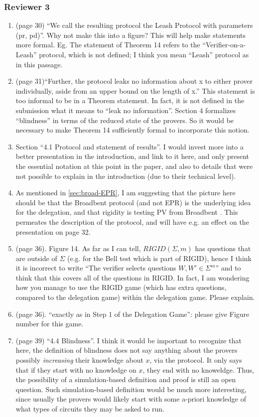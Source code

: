 \documentclass[12pt]{article}
\newcommand{\Broad}{{\sf Broadbent }}
\begin{document}
\subsubsection*{Reviewer 3}
\begin{enumerate}
\item (page 30) ``We call the resulting protocol the Leash Protocol with parameters (pr, pd)''. Why not make this into a figure? This will help make statements more formal. Eg. The statement of Theorem 14 refers to the ``Verifier-on-a-Leash'' protocol, which is not defined; I think you mean ``Leash'' protocol as in this passage.
    \item (page 31)``Further, the protocol leaks no information about x to either prover individually, aside from an upper bound
on the length of x.'' This statement is too informal to be in a Theorem statement. In fact, it is not defined in the submission what it means to ``leak no information''. Section 4 formalizes ``blindness'' in terms of the reduced state of the provers. So it would be necessary to make Theorem 14 sufficiently formal to incorporate this notion.
\item Section ``4.1 Protocol and statement of results''. I would invest more into a better presentation in the introduction, and link to it here, and only present the essential notation at this point in the paper, and also to details that were not possible to explain in the introduction (due to their technical level).
 \item As mentioned in \ref{sec:broad-EPR}, I am suggesting that the picture here should be that the \Broad protocol (and not EPR) is the underlying idea for the delegation, and that rigidity is testing PV from \Broad. This permeates the description of the protocol, and will have e.g. an effect on the presentation on page 32.
     \item (page 36). Figure 14. As far as I can tell, $RIGID(\Sigma, m)$ has questions that are outside of $\Sigma$ (e.g. for the Bell test which is part of RIGID), hence I think it is incorrect to write ``The verifier selects questions $W, W' \in \Sigma^m$'' and to think that this covers all of the questions in RIGID. In fact, I am wondering how you manage to use the RIGID game (which has extra questions, compared to the delegation game) within the delegation game. Please explain.
         \item (page 36). ``exactly as in Step 1 of the Delegation Game'': please give Figure number for this game.
\item (page 39) ``4.4 Blindness''. I think it would be important to recognize that here, the definition of blindness does not say anything about the provers possibly \emph{increasing} their knowledge about $x$, via the protocol. It only says that if they start with no knowledge on $x$, they end with no knoweldge. Thus, the possibility of a simulation-based definition and proof is still an open question. Such simulation-based definition would be much more interesting, since usually the provers would likely start with some a-priori knowledge of what types of circuits they may be asked to run.

\end{enumerate}
\end{document}
